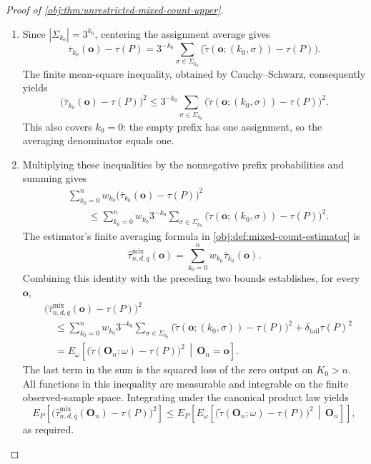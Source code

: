 \documentclass[11pt]{article}
\begin{document}
\begin{proof}[Proof of \cref{obj:thm:unrestricted-mixed-count-upper}]
\begin{enumerate}
\item Since \(|\Sigma_{k_0}|=3^{k_0}\), centering the assignment average gives
\[
\overline\tau_{k_0}(\mathbf o)-\tau(P)
=
3^{-k_0}\sum_{\sigma\in\Sigma_{k_0}}
 \bigl(\widetilde\tau(\mathbf o;(k_0,\sigma))-\tau(P)\bigr).
\]
The finite mean-square inequality, obtained by Cauchy--Schwarz, consequently yields
\[
\bigl(\overline\tau_{k_0}(\mathbf o)-\tau(P)\bigr)^2
\le
3^{-k_0}\sum_{\sigma\in\Sigma_{k_0}}
 \bigl(\widetilde\tau(\mathbf o;(k_0,\sigma))-\tau(P)\bigr)^2.
\]
This also covers \(k_0=0\): the empty prefix has one assignment, so the averaging denominator equals one.

\item Multiplying these inequalities by the nonnegative prefix probabilities and summing gives
\[
\begin{aligned}
&\sum_{k_0=0}^{n}w_{k_0}
 \bigl(\overline\tau_{k_0}(\mathbf o)-\tau(P)\bigr)^2\\
&\qquad\le
\sum_{k_0=0}^{n}w_{k_0}3^{-k_0}
 \sum_{\sigma\in\Sigma_{k_0}}
 \bigl(\widetilde\tau(\mathbf o;(k_0,\sigma))-\tau(P)\bigr)^2.
\end{aligned}
\]
The estimator's finite averaging formula in
\cref{obj:def:mixed-count-estimator} is
\[
\widehat\tau^{\mathrm{mix}}_{n,d,q}(\mathbf o)
=
\sum_{k_0=0}^{n}w_{k_0}\overline\tau_{k_0}(\mathbf o).
\]
Combining this identity with the preceding two bounds establishes, for every \(\mathbf o\),
\[
\begin{aligned}
&\bigl(\widehat\tau^{\mathrm{mix}}_{n,d,q}(\mathbf o)-\tau(P)\bigr)^2\\
&\quad\le
\sum_{k_0=0}^{n}w_{k_0}3^{-k_0}
 \sum_{\sigma\in\Sigma_{k_0}}
 \bigl(\widetilde\tau(\mathbf o;(k_0,\sigma))-\tau(P)\bigr)^2
+\delta_{\mathrm{tail}}\tau(P)^2\\
&\quad=
E_\omega\!\left[
 \bigl(\widetilde\tau(\mathbf O_n;\omega)-\tau(P)\bigr)^2
 \,\middle|\,\mathbf O_n=\mathbf o
\right].
\end{aligned}
\]
The last term in the sum is the squared loss of the zero output on \(K_0>n\). All functions in this inequality are measurable and integrable on the finite observed-sample space. Integrating under the canonical product law yields
\[
E_P\!\left[
 \bigl(\widehat\tau^{\mathrm{mix}}_{n,d,q}(\mathbf O_n)-\tau(P)\bigr)^2
\right]
\le
E_P\!\left[
 E_\omega\!\left[
  \bigl(\widetilde\tau(\mathbf O_n;\omega)-\tau(P)\bigr)^2
  \,\middle|\,\mathbf O_n
 \right]
\right],
\]
as required.
\end{enumerate}
\end{proof}
\end{document}
